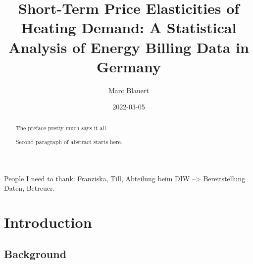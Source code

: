 \documentclass[12pt,twoside]{reedthesis}
\title{Short-Term Price Elasticities of Heating Demand: A Statistical Analysis of Energy Billing Data in Germany}
\author{Marc Blauert}
\date{2022-03-05}
\begin{document}
  \maketitle

\frontmatter %
\pagestyle{empty} %
  \begin{acknowledgements}
    People I need to thank: Franziska, Till, Abteilung beim DIW --\textgreater{} Bereitstellung Daten, Betreuer.
  \end{acknowledgements}

  \hypersetup{linkcolor=black}
  \setcounter{secnumdepth}{2}
  \setcounter{tocdepth}{2}
  \tableofcontents

  \listoftables

  \listoffigures
  \begin{abstract}
    The preface pretty much says it all.

    \par

    Second paragraph of abstract starts here.
  \end{abstract}

\mainmatter %
\pagestyle{fancyplain} %

\setlength{\parskip}{6pt} %

\hypertarget{introduction}{%
\chapter{Introduction}\label{introduction}}

\hypertarget{background}{%
\section{Background}\label{background}}
\end{document}
